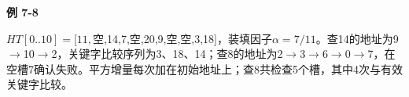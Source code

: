 {\color{ink}\bfseries 例 7-8}\par\vspace{1bp}\(HT[0..10]=\allowbreak{}[11,\allowbreak{}\)空,\allowbreak{}14,\allowbreak{}7,\allowbreak{}空,\allowbreak{}20,\allowbreak{}9,\allowbreak{}空,\allowbreak{}空,\allowbreak{}3,\allowbreak{}18]，装填因子\(\alpha =\allowbreak{}7/\allowbreak{}11\)。查14的地址为9\(\to \)10\(\to \)2，关键字比较序列为3、18、14；查8的地址为2\(\to \)3\(\to \)6\(\to \)0\(\to \)7，在空槽7确认失败。平方增量每次加在初始地址上；查8共检查5个槽，其中4次与有效关键字比较。
